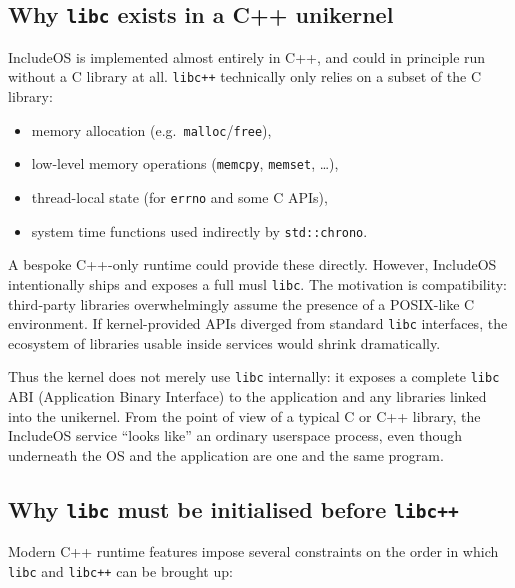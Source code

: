\documentclass[a4paper,11pt]{article}
\begin{document}
\subsection{Why \texttt{libc} exists in a C++ unikernel}

IncludeOS is implemented almost entirely in C++, and could in principle
run without a C library at all. \texttt{libc++} technically only relies
on a subset of the C library:

\begin{itemize}
  \item memory allocation (e.g.\ \texttt{malloc}/\texttt{free}),
  \item low-level memory operations (\texttt{memcpy}, \texttt{memset}, \dots),
  \item thread-local state (for \texttt{errno} and some C APIs),
  \item system time functions used indirectly by \texttt{std::chrono}.
\end{itemize}

A bespoke C++-only runtime could provide these directly. However,
IncludeOS intentionally ships and exposes a full musl \texttt{libc}. The
motivation is compatibility: third-party libraries overwhelmingly assume
the presence of a POSIX-like C environment. If kernel-provided APIs
diverged from standard \texttt{libc} interfaces, the ecosystem of
libraries usable inside services would shrink dramatically.

Thus the kernel does not merely use \texttt{libc} internally: it exposes
a complete \texttt{libc} ABI (Application Binary Interface) to the
application and any libraries linked into the unikernel. From the point
of view of a typical C or C++ library, the IncludeOS service “looks
like” an ordinary userspace process, even though underneath the OS and
the application are one and the same program.

\subsection{Why \texttt{libc} must be initialised before \texttt{libc++}}

Modern C++ runtime features impose several constraints on the order in
which \texttt{libc} and \texttt{libc++} can be brought up:
\end{document}
